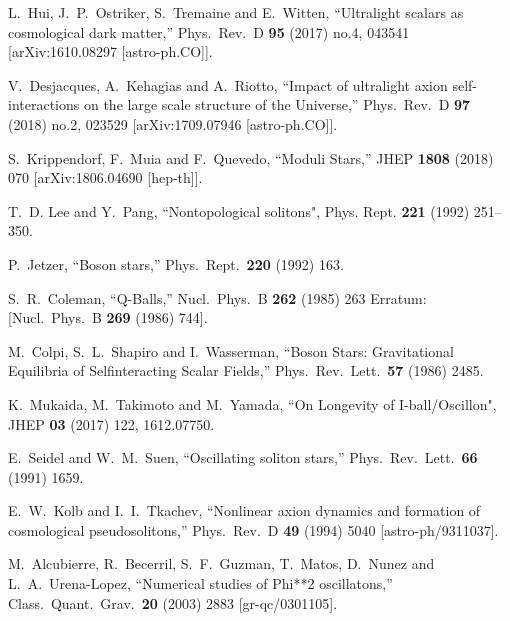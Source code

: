 \documentclass[11pt,a4paper]{article}
\begin{document}
\begin{thebibliography}{99}
  L.~Hui, J.~P.~Ostriker, S.~Tremaine and E.~Witten,
  ``Ultralight scalars as cosmological dark matter,''
  Phys.\ Rev.\ D {\bf 95} (2017) no.4,  043541
  [arXiv:1610.08297 [astro-ph.CO]].
  
  V.~Desjacques, A.~Kehagias and A.~Riotto,
  ``Impact of ultralight axion self-interactions on the large scale structure of the Universe,''
  Phys.\ Rev.\ D {\bf 97} (2018) no.2,  023529
  [arXiv:1709.07946 [astro-ph.CO]].
  
  S.~Krippendorf, F.~Muia and F.~Quevedo,
  ``Moduli Stars,''
  JHEP {\bf 1808} (2018) 070
  [arXiv:1806.04690 [hep-th]].
  
T.~D. Lee and Y.~Pang,
``Nontopological solitons",
  Phys. Rept. \textbf{221} (1992) 251--350.
  
  P.~Jetzer,
  ``Boson stars,''
  Phys.\ Rept.\  {\bf 220} (1992) 163.
  
  S.~R.~Coleman,
  ``Q-Balls,''
  Nucl.\ Phys.\ B {\bf 262} (1985) 263
   Erratum: [Nucl.\ Phys.\ B {\bf 269} (1986) 744].

  M.~Colpi, S.~L.~Shapiro and I.~Wasserman,
  ``Boson Stars: Gravitational Equilibria of Selfinteracting Scalar Fields,''
  Phys.\ Rev.\ Lett.\  {\bf 57} (1986) 2485.

K.~Mukaida, M.~Takimoto and M.~Yamada, 
``On Longevity of I-ball/Oscillon",
JHEP \textbf{03} (2017) 122,
1612.07750.
  
  E.~Seidel and W.~M.~Suen,
  ``Oscillating soliton stars,''
  Phys.\ Rev.\ Lett.\  {\bf 66} (1991) 1659.  
  
  E.~W.~Kolb and I.~I.~Tkachev,
  ``Nonlinear axion dynamics and formation of cosmological pseudosolitons,''
  Phys.\ Rev.\ D {\bf 49} (1994) 5040
  [astro-ph/9311037].
  
  M.~Alcubierre, R.~Becerril, S.~F.~Guzman, T.~Matos, D.~Nunez and L.~A.~Urena-Lopez,
  ``Numerical studies of Phi**2 oscillatons,''
  Class.\ Quant.\ Grav.\  {\bf 20} (2003) 2883
  [gr-qc/0301105].
  

\end{thebibliography}
\end{document}
